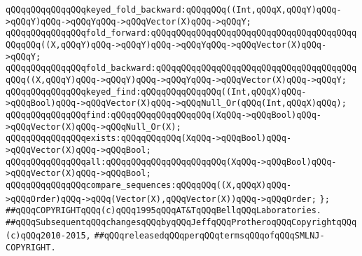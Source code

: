 \verb|qQQqqQQqqQQqqQQqkeyed_fold_backward:qQQqqQQq((Int,qQQqX,qQQqY)qQQq->qQQqY)qQQq->qQQqYqQQq->qQQqVector(X)qQQq->qQQqY;|\newline
\newline
\verb|qQQqqQQqqQQqqQQqfold_forward:qQQqqQQqqQQqqQQqqQQqqQQqqQQqqQQqqQQqqQQqqQQqqQQq((X,qQQqY)qQQq->qQQqY)qQQq->qQQqYqQQq->qQQqVector(X)qQQq->qQQqY;|\newline
\verb|qQQqqQQqqQQqqQQqfold_backward:qQQqqQQqqQQqqQQqqQQqqQQqqQQqqQQqqQQqqQQqqQQq((X,qQQqY)qQQq->qQQqY)qQQq->qQQqYqQQq->qQQqVector(X)qQQq->qQQqY;|\newline
\newline
\verb|qQQqqQQqqQQqqQQqkeyed_find:qQQqqQQqqQQqqQQq((Int,qQQqX)qQQq->qQQqBool)qQQq->qQQqVector(X)qQQq->qQQqNull_Or(qQQq(Int,qQQqX)qQQq);|\newline
\verb|qQQqqQQqqQQqqQQqfind:qQQqqQQqqQQqqQQqqQQq(XqQQq->qQQqBool)qQQq->qQQqVector(X)qQQq->qQQqNull_Or(X);|\newline
\newline
\verb|qQQqqQQqqQQqqQQqexists:qQQqqQQqqQQq(XqQQq->qQQqBool)qQQq->qQQqVector(X)qQQq->qQQqBool;|\newline
\verb|qQQqqQQqqQQqqQQqall:qQQqqQQqqQQqqQQqqQQqqQQq(XqQQq->qQQqBool)qQQq->qQQqVector(X)qQQq->qQQqBool;|\newline
\newline
\verb|qQQqqQQqqQQqqQQqcompare_sequences:qQQqqQQq((X,qQQqX)qQQq->qQQqOrder)qQQq->qQQq(Vector(X),qQQqVector(X))qQQq->qQQqOrder;|\newline
\verb|};|\newline
\newline
\newline
\verb|##qQQqCOPYRIGHTqQQq(c)qQQq1995qQQqAT&TqQQqBellqQQqLaboratories.|\newline
\verb|##qQQqSubsequentqQQqchangesqQQqbyqQQqJeffqQQqProtheroqQQqCopyrightqQQq(c)qQQq2010-2015,|\newline
\verb|##qQQqreleasedqQQqperqQQqtermsqQQqofqQQqSMLNJ-COPYRIGHT.|\newline

